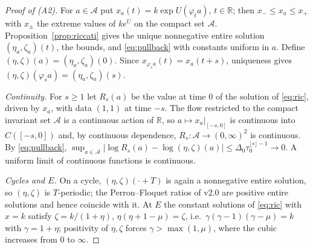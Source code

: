 \documentclass[11pt,a4paper]{article}
\numberwithin{equation}{section}
\theoremstyle{remark}\newtheorem{remark}[theorem]{Remark}
\newcommand{\R}{\mathbb R}
\newcommand{\cA}{\mathcal A}
\begin{document}
\begin{proof}[Proof of (A2)]
For $a\in\cA$ put $x_a(t)=k\exp U(\varphi_ta)$, $t\in\R$; then $x_-\le x_a\le x_+$ with $x_\pm$ the extreme values of
$ke^{U}$ on the compact set $\cA$. Proposition~\ref{prop:riccati} gives the unique nonnegative entire solution
$(\eta_a,\zeta_a)(t)$, the bounds, and \eqref{eq:pullback} with constants uniform in $a$. Define
$(\eta,\zeta)(a)=(\eta_a,\zeta_a)(0)$. Since $x_{\varphi_sa}(t)=x_a(t+s)$, uniqueness gives
$(\eta,\zeta)(\varphi_sa)=(\eta_a,\zeta_a)(s)$.

\emph{Continuity.} For $s\ge1$ let $R_s(a)$ be the value at time $0$ of the solution of \eqref{eq:ric}, driven by
$x_a$, with data $(1,1)$ at time $-s$. The flow restricted to the compact invariant set $\cA$ is a continuous action
of $\R$, so $a\mapsto x_a|_{[-s,0]}$ is continuous into $C([-s,0])$ and, by continuous dependence, $R_s:\cA\to
(0,\infty)^2$ is continuous. By \eqref{eq:pullback}, $\sup_{a\in\cA}|\log R_s(a)-\log(\eta,\zeta)(a)|\le
\Delta_0\tau_0^{\lfloor s\rfloor-1}\to0$. A uniform limit of continuous functions is continuous.

\emph{Cycles and $E$.} On a cycle, $(\eta,\zeta)(\cdot+T)$ is again a nonnegative entire solution, so
$(\eta,\zeta)$ is $T$-periodic; the Perron--Floquet ratios of v2.0 are positive entire solutions and hence coincide
with it. At $E$ the constant solutions of \eqref{eq:ric} with $x=k$ satisfy $\zeta=k/(1+\eta)$,
$\eta(\eta+1-\mu)=\zeta$, i.e.\ $\gamma(\gamma-1)(\gamma-\mu)=k$ with $\gamma=1+\eta$; positivity of $\eta,\zeta$
forces $\gamma>\max(1,\mu)$, where the cubic increases from $0$ to $\infty$.
\end{proof}
\end{document}
